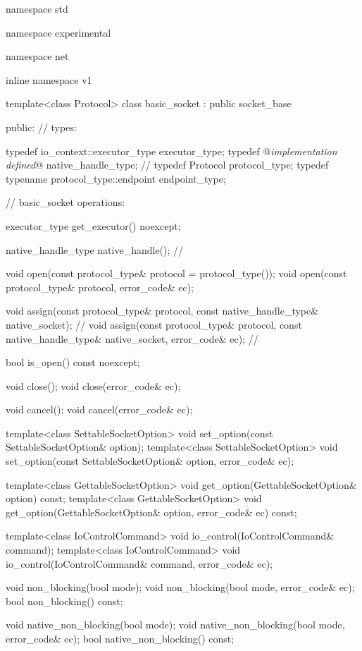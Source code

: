 \begin{codeblock}
namespace std {
namespace experimental {
namespace net {
inline namespace v1 {

  template<class Protocol>
  class basic_socket : public socket_base
  {
  public:
    // types:

    typedef io_context::executor_type executor_type;
    typedef @\textit{implementation defined}@ native_handle_type; // \nativeref
    typedef Protocol protocol_type;
    typedef typename protocol_type::endpoint endpoint_type;

    // basic_socket operations:

    executor_type get_executor() noexcept;

    native_handle_type native_handle(); // \nativeref

    void open(const protocol_type& protocol = protocol_type());
    void open(const protocol_type& protocol, error_code& ec);

    void assign(const protocol_type& protocol,
                const native_handle_type& native_socket); // \nativeref
    void assign(const protocol_type& protocol,
                const native_handle_type& native_socket,
                error_code& ec); // \nativeref

    bool is_open() const noexcept;

    void close();
    void close(error_code& ec);

    void cancel();
    void cancel(error_code& ec);

    template<class SettableSocketOption>
      void set_option(const SettableSocketOption& option);
    template<class SettableSocketOption>
      void set_option(const SettableSocketOption& option, error_code& ec);

    template<class GettableSocketOption>
      void get_option(GettableSocketOption& option) const;
    template<class GettableSocketOption>
      void get_option(GettableSocketOption& option, error_code& ec) const;

    template<class IoControlCommand>
      void io_control(IoControlCommand& command);
    template<class IoControlCommand>
      void io_control(IoControlCommand& command, error_code& ec);

    void non_blocking(bool mode);
    void non_blocking(bool mode, error_code& ec);
    bool non_blocking() const;

    void native_non_blocking(bool mode);
    void native_non_blocking(bool mode, error_code& ec);
    bool native_non_blocking() const;

}}}}}
\end{codeblock}
